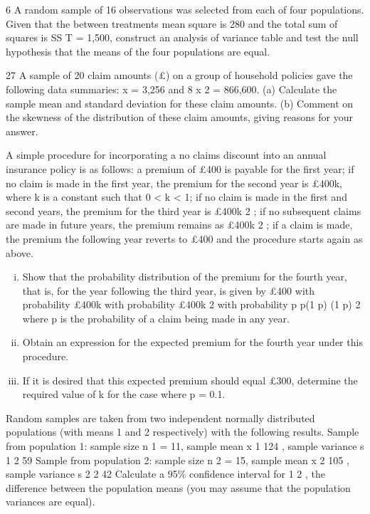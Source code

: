 \documentclass[a4paper,12pt]{article}
\begin{document}
6
A random sample of 16 observations was selected from each of four populations. Given that the between treatments mean square is 280 and the total sum of squares is SS T = 1,500, construct an analysis of variance table and test the null hypothesis that the means of the four populations are equal.

27
A sample of 20 claim amounts (£) on a group of household policies gave the
following data summaries:
x = 3,256 and
8
x 2 = 866,600.
(a) Calculate the sample mean and standard deviation for these claim amounts.
(b) Comment on the skewness of the distribution of these claim amounts, giving reasons for your answer.

A simple procedure for incorporating a no claims discount into an annual insurance policy is as follows:
a premium of £400 is payable for the first year;
if no claim is made in the first year, the premium for the second year is £400k,
where k is a constant such that 0 < k < 1;
if no claim is made in the first and second years, the premium for the third
year is £400k 2 ;
if no subsequent claims are made in future years, the premium remains as
£400k 2 ;
if a claim is made, the premium the following year reverts to £400 and the
procedure starts again as above.

\begin{enumerate}[(i)]
\item
Show that the probability distribution of the premium for the fourth year, that
is, for the year following the third year, is given by
£400
with probability
£400k with probability
£400k 2 with probability
p
p(1 p)
(1 p) 2
where p is the probability of a claim being made in any year.

\item  Obtain an expression for the expected premium for the fourth year under this
procedure.

\item If it is desired that this expected premium should equal £300, determine the
required value of k for the case where p = 0.1.
\end{enumerate}

Random samples are taken from two independent normally distributed populations
(with means 1 and 2 respectively) with the following results.
Sample from population 1:
sample size n 1 = 11, sample mean x 1 124 , sample variance s 1 2
59
Sample from population 2:
sample size n 2 = 15, sample mean x 2 105 , sample variance s 2 2
42
Calculate a 95\% confidence interval for 1
2 , the difference between the
population means (you may assume that the population variances are equal).
\newpage
\end{document}
